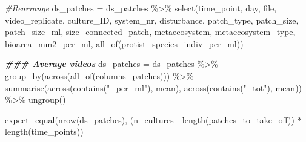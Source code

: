 \documentclass[
]{article}
\newenvironment{Shaded}{\begin{snugshade}}{\end{snugshade}}
\newcommand{\CommentTok}[1]{\textcolor[rgb]{0.56,0.35,0.01}{\textit{#1}}}
\newcommand{\DocumentationTok}[1]{\textcolor[rgb]{0.56,0.35,0.01}{\textbf{\textit{#1}}}}
\newcommand{\FunctionTok}[1]{\textcolor[rgb]{0.00,0.00,0.00}{#1}}
\newcommand{\NormalTok}[1]{#1}
\newcommand{\OtherTok}[1]{\textcolor[rgb]{0.56,0.35,0.01}{#1}}
\newcommand{\SpecialCharTok}[1]{\textcolor[rgb]{0.00,0.00,0.00}{#1}}
\newcommand{\StringTok}[1]{\textcolor[rgb]{0.31,0.60,0.02}{#1}}
\begin{document}
\begin{Shaded}
\begin{Highlighting}[]
\CommentTok{\#Rearrange}
\NormalTok{ds\_patches }\OtherTok{=}\NormalTok{ ds\_patches }\SpecialCharTok{\%\textgreater{}\%}
  \FunctionTok{select}\NormalTok{(time\_point,}
\NormalTok{         day,}
\NormalTok{         file,}
\NormalTok{         video\_replicate,}
\NormalTok{         culture\_ID,}
\NormalTok{         system\_nr,}
\NormalTok{         disturbance,}
\NormalTok{         patch\_type,}
\NormalTok{         patch\_size,}
\NormalTok{         patch\_size\_ml,}
\NormalTok{         size\_connected\_patch,}
\NormalTok{         metaecosystem,}
\NormalTok{         metaecosystem\_type,}
\NormalTok{         bioarea\_mm2\_per\_ml,}
         \FunctionTok{all\_of}\NormalTok{(protist\_species\_indiv\_per\_ml))}
\end{Highlighting}
\end{Shaded}

\begin{Shaded}
\begin{Highlighting}[]
\DocumentationTok{\#\#\# Average videos}
\NormalTok{ds\_patches }\OtherTok{=}\NormalTok{ ds\_patches }\SpecialCharTok{\%\textgreater{}\%}
  \FunctionTok{group\_by}\NormalTok{(}\FunctionTok{across}\NormalTok{(}\FunctionTok{all\_of}\NormalTok{(columns\_patches))) }\SpecialCharTok{\%\textgreater{}\%}
  \FunctionTok{summarise}\NormalTok{(}\FunctionTok{across}\NormalTok{(}\FunctionTok{contains}\NormalTok{(}\StringTok{"\_per\_ml"}\NormalTok{), mean),}
            \FunctionTok{across}\NormalTok{(}\FunctionTok{contains}\NormalTok{(}\StringTok{"\_tot"}\NormalTok{), mean)) }\SpecialCharTok{\%\textgreater{}\%}
  \FunctionTok{ungroup}\NormalTok{()}

\FunctionTok{expect\_equal}\NormalTok{(}\FunctionTok{nrow}\NormalTok{(ds\_patches),}
\NormalTok{             (n\_cultures }\SpecialCharTok{{-}} \FunctionTok{length}\NormalTok{(patches\_to\_take\_off)) }\SpecialCharTok{*} \FunctionTok{length}\NormalTok{(time\_points))}
\end{Highlighting}
\end{Shaded}
\end{document}
